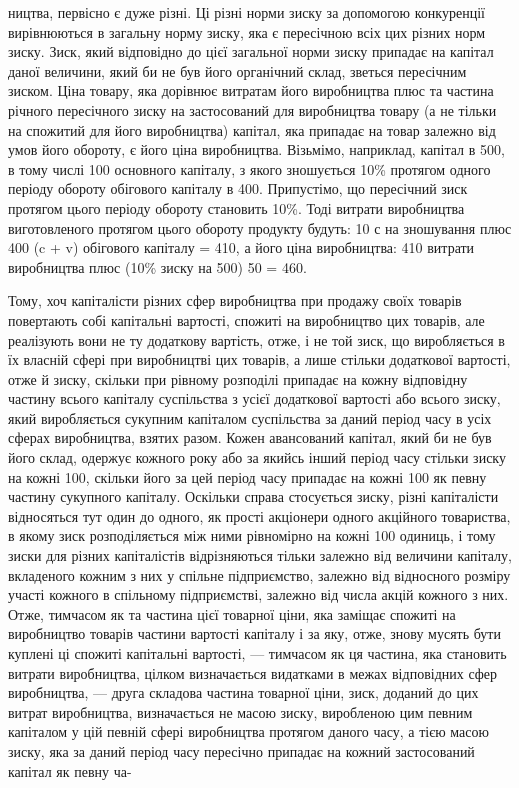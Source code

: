 ництва, первісно є дуже різні. Ці різні норми зиску за допомогою конкуренції вирівнюються в загальну
норму зиску, яка
є пересічною всіх цих різних норм зиску. Зиск, який відповідно
до цієї загальної норми зиску припадає на капітал даної величини, який би не був його органічний
склад, зветься пересічним
зиском. Ціна товару, яка дорівнює витратам його виробництва
плюс та частина річного пересічного зиску на застосований для
виробництва товару (а не тільки на спожитий для його виробництва) капітал, яка припадає на товар
залежно від умов його
обороту, є його ціна виробництва. Візьмімо, наприклад, капітал
в 500, в тому числі 100 основного капіталу, з якого зношується
10\% протягом одного періоду обороту обігового капіталу в 400.
Припустімо, що пересічний зиск протягом цього періоду обороту становить 10\%. Тоді витрати
виробництва виготовленого
протягом цього обороту продукту будуть: 10 с на зношування
плюс 400 (c + v) обігового капіталу = 410, а його ціна виробництва: 410 витрати виробництва плюс
(10\% зиску на 500) 50 = 460.

Тому, хоч капіталісти різних сфер виробництва при продажу
своїх товарів повертають собі капітальні вартості, спожиті на
виробництво цих товарів, але реалізують вони не ту додаткову
вартість, отже, і не той зиск, що виробляється в їх власній
сфері при виробництві цих товарів, а лише стільки додаткової вартості, отже й зиску, скільки при
рівному розподілі
припадає на кожну відповідну частину всього капіталу суспільства з усієї додаткової вартості або
всього зиску, який виробляється сукупним капіталом суспільства за даний період часу
в усіх сферах виробництва, взятих разом. Кожен авансований
капітал, який би не був його склад, одержує кожного року або
за якийсь інший період часу стільки зиску на кожні 100, скільки
його за цей період часу припадає на кожні 100 як певну частину
сукупного капіталу. Оскільки справа стосується зиску, різні капіталісти відносяться тут один до
одного, як прості акціонери
одного акційного товариства, в якому зиск розподіляється між
ними рівномірно на кожні 100 одиниць, і тому зиски для різних
капіталістів відрізняються тільки залежно від величини капіталу,
вкладеного кожним з них у спільне підприємство, залежно від
відносного розміру участі кожного в спільному підприємстві,
залежно від числа акцій кожного з них. Отже, тимчасом як та
частина цієї товарної ціни, яка заміщає спожиті на виробництво
товарів частини вартості капіталу і за яку, отже, знову мусять
бути куплені ці спожиті капітальні вартості, — тимчасом як ця
частина, яка становить витрати виробництва, цілком визначається
видатками в межах відповідних сфер виробництва, — друга складова частина товарної ціни, зиск,
доданий до цих витрат виробництва, визначається не масою зиску, виробленою цим певним
капіталом у цій певній сфері виробництва протягом даного
часу, а тією масою зиску, яка за даний період часу пересічно припадає на кожний застосований капітал
як певну ча-
